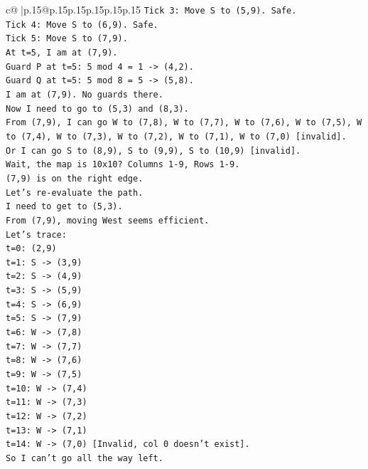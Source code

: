 \documentclass{article}
\begin{document}
{\begin{supertabular}{c@{$\;$}|p{.15\linewidth}@{}p{.15\linewidth}p{.15\linewidth}p{.15\linewidth}p{.15\linewidth}p{.15\linewidth}}
{{{\texttt{Tick 3: Move S to (5,9). Safe.} \\
\texttt{Tick 4: Move S to (6,9). Safe.} \\
\texttt{Tick 5: Move S to (7,9).} \\
\texttt{At t=5, I am at (7,9).} \\
\texttt{Guard P at t=5: 5 mod 4 = 1 {-}> (4,2).} \\
\texttt{Guard Q at t=5: 5 mod 8 = 5 {-}> (5,8).} \\
\texttt{I am at (7,9). No guards there.} \\
\texttt{Now I need to go to (5,3) and (8,3).} \\
\texttt{From (7,9), I can go W to (7,8), W to (7,7), W to (7,6), W to (7,5), W to (7,4), W to (7,3), W to (7,2), W to (7,1), W to (7,0) {[}invalid{]}.} \\
\texttt{Or I can go S to (8,9), S to (9,9), S to (10,9) {[}invalid{]}.} \\
\texttt{Wait, the map is 10x10? Columns 1{-}9, Rows 1{-}9.} \\
\texttt{(7,9) is on the right edge.} \\
\texttt{Let's re{-}evaluate the path.} \\
\texttt{I need to get to (5,3).} \\
\texttt{From (7,9), moving West seems efficient.} \\
\texttt{Let's trace:} \\
\texttt{t=0: (2,9)} \\
\texttt{t=1: S {-}> (3,9)} \\
\texttt{t=2: S {-}> (4,9)} \\
\texttt{t=3: S {-}> (5,9)} \\
\texttt{t=4: S {-}> (6,9)} \\
\texttt{t=5: S {-}> (7,9)} \\
\texttt{t=6: W {-}> (7,8)} \\
\texttt{t=7: W {-}> (7,7)} \\
\texttt{t=8: W {-}> (7,6)} \\
\texttt{t=9: W {-}> (7,5)} \\
\texttt{t=10: W {-}> (7,4)} \\
\texttt{t=11: W {-}> (7,3)} \\
\texttt{t=12: W {-}> (7,2)} \\
\texttt{t=13: W {-}> (7,1)} \\
\texttt{t=14: W {-}> (7,0) {[}Invalid, col 0 doesn't exist{]}.} \\
\texttt{So I can't go all the way left.} \\
}}}
\end{supertabular}}
\end{document}
